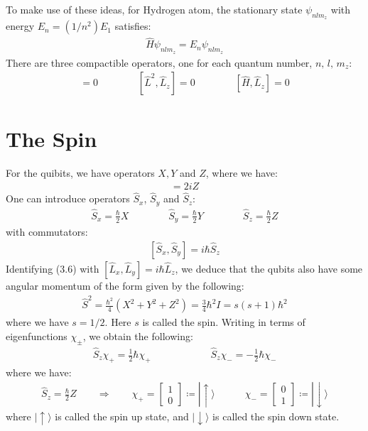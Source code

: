 \documentclass[11pt]{book}
\theoremstyle{break}
\theoremstyle{break}
\newcommand{\bmat}[1]{\begin{bmatrix} #1 \end{bmatrix}}
\begin{document}
To make use of these ideas, for Hydrogen atom, the stationary state $\psi_{nlm_z}$ with energy $E_n = (1/n^2) E_1$ satisfies: 
\begin{align*}
\hat{H}\psi_{nlm_z} = E_n \psi_{nlm_z}
\end{align*}
There are three compactible operators, one for each quantum number, $n,\,l,\, m_z$:
\begin{align*}
[\hat{L}^2, \hat{H}] = 0\qquad\qquad
[\hat{L}^2, \hat{L}_z] = 0 \qquad\qquad
[\hat{H}, \hat{L}_z] = 0
\end{align*}
\newpage

\section[The Spin]{\color{red}The Spin\color{black}}
For the quibits, we have operators $X,Y$ and $Z$, where we have:
\begin{align*}
[X,Y] = 2iZ
\end{align*}
One can introduce operators $\hat{S}_x$, $\hat{S}_y$ and $\hat{S}_z$:
\begin{align*}
\hat{S}_x = \frac{\hbar}{2}X\qquad\qquad \hat{S}_y = \frac{\hbar}{2}Y\qquad\qquad \hat{S}_z = \frac{\hbar}{2}Z
\end{align*}
with commutators:
\begin{align}
\left[\hat{S}_x, \hat{S}_y\right] = i\hbar \hat{S}_z
\end{align}
Identifying (3.6) with $[\hat{L}_x, \hat{L}_y]=i\hbar \hat{L}_z$, we deduce that the qubits also have some angular momentum of the form given by the following:
\begin{align*}
\hat{S}^2 = \frac{\hbar^2}{4}\left( X^2 + Y^2 + Z^2 \right) = \frac{3}{4}\hbar^2 I = s(s+1) \hbar^2
\end{align*}
where we have $s = 1/2$. Here $s$ is called the spin. Writing in terms of eigenfunctions $\chi_{\pm}$, we obtain the following:
\begin{align*}
\hat{S}_z \chi_+ = \frac{1}{2}\hbar \chi_+ \qquad\qquad\qquad \hat{S}_z \chi_- =-\frac{1}{2}\hbar\chi_-
\end{align*}
where we have:
\begin{align*}
\hat{S}_z = \frac{\hbar}{2}Z \qquad \Rightarrow \qquad \chi_+ = \bmat{1\\0}\coloneqq |\uparrow\rangle \quad\qquad \chi_- = \bmat{0 \\1}\coloneqq |\downarrow\rangle
\end{align*}
where $|\uparrow\rangle$ is called the spin up state, and $|\downarrow\rangle$ is called the spin down state.\\
\end{document}
